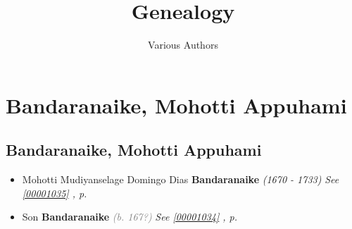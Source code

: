 \documentclass[10pt, openany]{book}
\begin{document}
\title{Genealogy}
\author{Various Authors}
\date{ }
\maketitle
\tableofcontents
\part{Bandaranaike, Mohotti Appuhami}
\chapter{Bandaranaike, Mohotti Appuhami}
\label{00001033}
\textcolor{slmaroon}{\textit{}}
\begin{itemize}
\item{Mohotti Mudiyanselage Domingo Dias \textbf{Bandaranaike} \textcolor{slorange}{\textit{(1670 - 1733)}} \textcolor{slteal}{\textit{See  \autoref{00001035} \textit{, p. \pageref{00001035} }}}}
\item{Son \textbf{Bandaranaike} \textcolor{gray}{\textit{(b. 167?)}} \textcolor{slteal}{\textit{See  \autoref{00001034} \textit{, p. \pageref{00001034} }}}}
\end{itemize}
  
\end{document}
